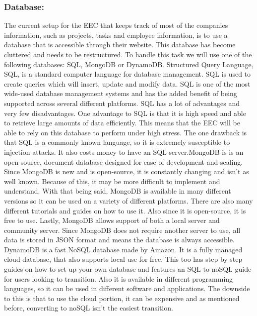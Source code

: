 \documentclass[letterpaper,10pt,titlepage,journal,compsoc,draftclsnofoot,onecolumn]{IEEEtran}
\newcommand\tab[1][1cm]{\hspace*{#1}}
\begin{document}
\subsubsection{Database:}	
\tab The current setup for the EEC that keeps track of most of the companies information, such as projects, tasks and employee information, is to use a database that is accessible through their website. This database has become cluttered and needs to be restructured. To handle this task we will use one of the following databases: SQL, MongoDB or DynamoDB. \newline\newline\tab Structured Query Language, SQL, is a standard computer language for database management. SQL is used to create queries which will insert, update and modify data. SQL is one of the most wide-used database management systems and has the added benefit of being supported across several different platforms. SQL has a lot of advantages and very few disadvantages. One advantage to SQL is that it is high speed and able to retrieve large amounts of data efficiently. This means that the EEC will be able to rely on this database to perform under high stress. The one drawback is that SQL is a commonly known language, so it is extremely susceptible to injection attacks. It also costs money to have an SQL server.\newline\newline\tab MongoDB is is an open-source, document database designed for ease of development and scaling. Since MongoDB is new and is open-source, it is constantly changing and isn’t as well known. Because of this, it may be more difficult to implement and understand. With that being said, MongoDB is available in many different versions so it can be used on a variety of different platforms. There are also many different tutorials and guides on how to use it. Also since it is open-source, it is free to use. Lastly, MongoDB allows support of both a local server and community server. Since MongoDB does not require another server to use, all data is stored in JSON format and means the database is always accessible. \newline\newline\tab DynamoDB is a fast NoSQL database made by Amazon. It is a fully managed cloud database, that also supports local use for free. This too has step by step guides on how to set up your own database and features an SQL to noSQL guide for users looking to transition. Also it is available in different programming languages, so it can be used in different software and applications. The downside to this is that to use the cloud portion, it can be expensive and as mentioned before, converting to noSQL isn’t the easiest transition. \newline
\end{document}
